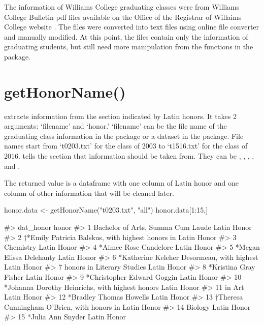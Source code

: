 The information of Williams College graduating classes were from
Williams College Bulletin pdf files available on the Office of the
Registrar of Willaims College website \citep{Registrar}. The files were
converted into text files using online file converter and manually
modified. At this point, the files contain only the information of
graduating students, but still need more manipulation from the functions
in the package.

\section{getHonorName()}\label{gethonorname}

 extracts information from the section indicated by
Latin honors. It takes 2 arguments: `filename' and `honor.' `filename'
can be the file name of the graduating class information in the package
or a dataset in the package. File names start from `t0203.txt' for the
class of 2003 to `t1516.txt' for the class of 2016.  tells
the section that information should be taken from. They can be
, , , , and .

The returned value is a dataframe with one column of Latin honor and one
column of other information that will be cleaned later.

\begin{Schunk}
\begin{Sinput}
honor.data <- getHonorName("t0203.txt", "all")
honor.data[1:15,]
\end{Sinput}
\begin{Soutput}
#>                                           dat_honor       honor
#> 1                 Bachelor of Arts, Summa Cum Laude Latin Honor
#> 2  †*Emily Patricia Balskus, with highest honors in Latin Honor
#> 3                                         Chemistry Latin Honor
#> 4                             *Aimee Rose Candelore Latin Honor
#> 5                           *Megan Elissa Delehanty Latin Honor
#> 6        *Katherine Keleher Desormeau, with highest Latin Honor
#> 7                        honors in Literary Studies Latin Honor
#> 8                             *Kristina Gray Fisher Latin Honor
#> 9                        *Christopher Edward Goggin Latin Honor
#> 10  *Johanna Dorothy Heinrichs, with highest honors Latin Honor
#> 11                                           in Art Latin Honor
#> 12                          *Bradley Thomas Howells Latin Honor
#> 13      †Theresa Cunningham O’Brien, with honors in Latin Honor
#> 14                                          Biology Latin Honor
#> 15                                *Julia Ann Snyder Latin Honor
\end{Soutput}
\end{Schunk}

